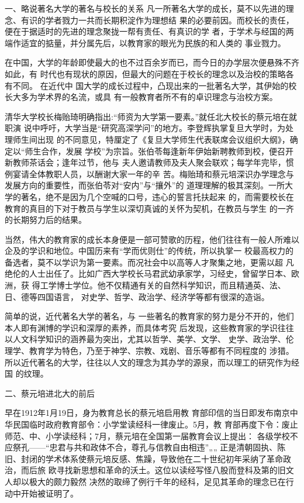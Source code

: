 \documentclass[11pt]{ctexart}
\begin{document}
{{{{一、略说著名大学的著名与校长的关系
凡一所著名大学的成长，莫不以先进的理念、有识的学者戮力一共而长期积淀作为理想结
果的必要前因。而校长的责任，便在于据适时的先进的理念聚拢一帮有责任、有真识的学
者，于学术与经国的两端作适宜的掂量，并分属先后，以教育家的眼光为民族的和人类的
事业戮力。

在中国，大学的年龄即使最大的也不过百余岁而已，而今日的办学层次便悬殊不齐如此，有
时代也有现状的原因，但最大的问题在于校长的理念以及治校的策略各有不同。  在近代中
国大学的成长过程中，凸现出来的一批著名大学，其伊始的校长大多为学术界的名流，或具
有一般教育者所不有的卓识理念与治校方案。

清华大学校长梅贻琦明确指出:“师资为大学第一要素。”就任北大校长的蔡元培在就职演
说中呼吁，大学当是“研究高深学问”的地方。李登辉执掌复旦大学时，为处理师生间出现
的不同意见，特厘定了《复旦大学师生代表联席会议组织大纲》，确定以“师生合作，发展
学校”为宗旨。张伯苓每逢新年伊始新聘教师到校，便召开新教师茶话会；逢年过节，他与
夫人邀请教师及夫人聚会联欢；每学年完毕，惯例宴请全体教职人员，以酬谢大家一年的辛
苦。梅贻琦和蔡元培深识办学理念与发展方向的重要性，而张伯苓对“安内”与“攘外”的
道理理解的极其深刻。一所大学的著名，绝不是因为几个空喊的口号，违心的誓言托扶起来
的，而需要校长在教育的真目的下对于教员与学生以深切真诚的关怀为契机，在教员与学生
的一齐的长期努力后的结果。

当然，伟大的教育家的成长本身便是一部可赞歌的历程，他们往往有一般人所难以企及的学识和地位。中国历来有“学而优则仕”的传统，所以执掌一
校最高权力的备选者，莫不以学识为第一要素。而况社会中以高等人才聚集之地，更需以超
凡绝伦的人士出任了。比如广西大学校长马君武幼承家学，习经史，曾留学日本、欧洲，获
得工学博士学位。他不仅精通有关的自然科学知识，而且精通英、法、日、德等四国语言，
对史学、哲学、政治学、经济学等都有很深的造诣。

简单的说，近代著名大学的著名，与
一些著名的教育家的努力是分不开的，他们本人即有渊博的学识和深厚的素养，而具体考究
后发现，这些教育家的学识往往以人文科学知识的涵养最为突出，尤其以哲学、美学、文学、
史学、政治学、伦理学、教育学为特色，乃至于神学、宗教、戏剧、音乐等都有不同程度的
涉猎。所以近代著名的大学，往往以人文的理念为其办学的源泉，而以理工的研究作为经国
的纹理。

二、蔡元培进北大的前后

早在1912年1月19日，身为教育总长的蔡元培启用教
育部印信的当日即发布南京中华民国临时政府教育部令：小学堂读经科一律废止。5月，教
育部再度下令：废止师范、中、小学读经科；7月，蔡元培在全国第一届教育会议上提出：
各级学校不应祭孔——“忠君与共和政体不合，尊孔与信教自由相违”„„ 正是清朝固执、陈
旧、封闭的学术体系使蔡元培反感、焦躁，导致他在二十世纪初年采纳了革命政治，而后旅
欧寻找新思想和革命的沃土。这位以读经写怪八股而登科及第的旧文人却以极大的颇力毅然
决然的取缔了例行千年的经科，足见其革命的理念已在行动中开始被证明了。

}}}}
\end{document}
